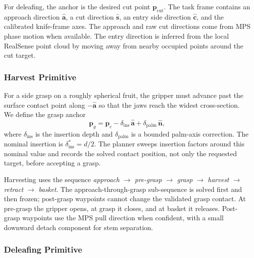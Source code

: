 For deleafing, the anchor is the desired cut point
$\mathbf{p}_{\mathrm{cut}}$.  The task frame contains an approach direction
$\hat{\mathbf{a}}$, a cut direction $\hat{\mathbf{s}}$, an entry
side direction $\hat{\mathbf{c}}$, and the calibrated knife-frame axes.
The approach and raw cut directions come from MPS phase motion when
available.  The entry direction is inferred from the local
RealSense point cloud by moving away from nearby occupied points around
the cut target.


\subsubsection{Harvest Primitive}
\label{app:harvest_primitive}

For a side grasp on a roughly spherical fruit, the gripper must advance
past the surface contact point along $-\hat{\mathbf{a}}$ so that the
jaws reach the widest cross-section.  We define the grasp anchor
%
\begin{equation}
  \mathbf{p}_g
  = \mathbf{p}_c
    - \delta_{\mathrm{ins}}\,\hat{\mathbf{a}}
    + \delta_{\mathrm{palm}}\,\hat{\mathbf{n}},
  \label{eq:grasp_anchor}
\end{equation}
%
where $\delta_{\mathrm{ins}}$ is the insertion depth and
$\delta_{\mathrm{palm}}$ is a bounded palm-axis correction.  The
nominal insertion is $\delta_{\mathrm{ins}}^{*}=d/2$.  The planner
sweeps insertion factors around this nominal value and records the
solved contact position, not only the requested target, before
accepting a grasp.

Harvesting uses the sequence
\emph{approach} $\rightarrow$ \emph{pre-grasp} $\rightarrow$
\emph{grasp} $\rightarrow$ \emph{harvest} $\rightarrow$
\emph{retract} $\rightarrow$ \emph{basket}.  The
approach-through-grasp sub-sequence is solved first and then frozen;
post-grasp waypoints cannot change the validated grasp contact.  At
pre-grasp the gripper opens, at grasp it closes, and at basket it
releases.  Post-grasp waypoints use the MPS pull direction when
confident, with a small downward detach component for stem separation.


\subsubsection{Deleafing Primitive}
\label{app:deleaf_primitive}

